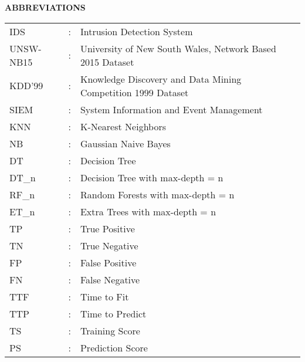 \begin{center}
\large{\textbf{ABBREVIATIONS}}\\
\vspace{1cm}
\end{center}

\begin{table}[bpht!]
\centering
	\begin{tabular}{lcl}
	IDS&:& Intrusion Detection System\\
    UNSW-NB15&:& University of New South Wales, Network Based 2015 Dataset\\
    KDD'99&:& Knowledge Discovery and Data Mining Competition 1999 Dataset\\
    SIEM&:& System Information and Event Management\\
    KNN&:& K-Nearest Neighbors\\
    NB&:& Gaussian Naive Bayes \\
    DT&:& Decision Tree \\
    DT\_n&:& Decision Tree with max-depth = n \\
    RF\_n&:& Random Forests with max-depth = n \\
    ET\_n&:& Extra Trees with max-depth = n\\
    TP&:& True Positive\\
    TN&:& True Negative\\
    FP&:& False Positive\\
    FN&:& False Negative\\
    TTF&:& Time to Fit \\
    TTP&:& Time to Predict \\
    TS&:& Training Score\\
    PS&:& Prediction Score
	\end{tabular}
\end{table}
